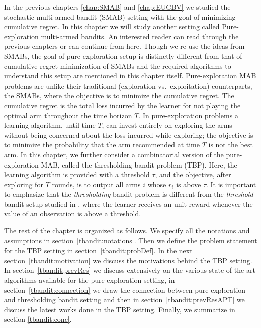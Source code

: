 In the previous chapters \ref{chap:SMAB} and \ref{chap:EUCBV} we studied the stochastic multi-armed bandit (SMAB) setting with the goal of minimizing cumulative regret. In this chapter we will study another setting called Pure-exploration multi-armed bandits. An interested reader can read through the previous chapters or can continue from here. Though we re-use the ideas from SMABs, the goal of pure exploration setup is distinctly different from that of cumulative regret minimization of SMABs and the required algorithms to understand this setup are mentioned in this chapter itself. Pure-exploration MAB problems are unlike their traditional (exploration vs.\ exploitation)  counterparts, the SMABs, where the  objective is to minimize the cumulative regret. The cumulative regret is the total loss incurred by the learner for not playing the optimal arm throughout the time horizon $T$. 
	In pure-exploration problems a learning algorithm, until time $T$, can invest entirely on exploring the arms without being concerned about the loss incurred while exploring; the objective is to minimize the probability that the arm recommended at time $T$ is not the best arm.  In this chapter, we further consider a combinatorial version of the pure-exploration MAB, called the thresholding bandit problem (TBP).  Here, the learning algorithm is provided with a threshold $\tau$, and the objective, after exploring for $T$ rounds, is to  output all arms $i$ whose $r_{i}$ is above $\tau$. 
It is important to emphasize that the \emph{thresholding} bandit problem is different from the \emph{threshold} bandit setup studied in \cite{abernethy2016threshold}, where the learner receives an unit reward whenever the value of an observation is above a threshold. 

	The rest of the chapter is organized as follows. We specify all the notations and assumptions in section~\ref{tbandit:notations}. Then we define the problem statement for the TBP setting in section~\ref{tbandit:probDef}. In the next section~\ref{tbandit:motivation} we discuss the motivations behind the TBP setting. In section~\ref{tbandit:prevRes} we discuss extensively on the various state-of-the-art algorithms available for the pure exploration setting, in section~\ref{tbandit:connection} we draw the connection between pure exploration and thresholding bandit setting and then in section~\ref{tbandit:prevResAPT} we discuss the latest works done in the TBP setting. Finally, we summarize in section \ref{tbandit:conc}.

